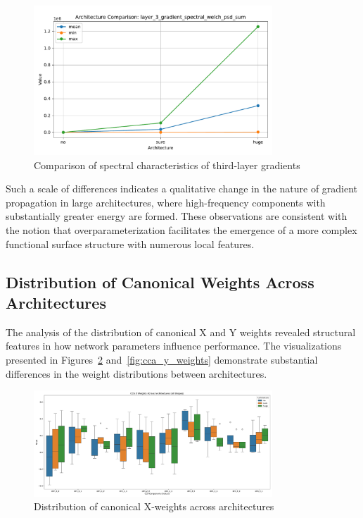 \documentclass[a4paper,12pt]{article}
\begin{document}
\begin{figure}[ht]
  \centering
  \includegraphics[width=0.8\textwidth]{resources_en/layer_3_gradient_spectral_welch_psd_sum_comparison.pdf}
  \caption{Comparison of spectral characteristics of third-layer gradients}
  \label{fig:layer3_gradient_spectral}
\end{figure}

Such a scale of differences indicates a qualitative change in the nature of gradient propagation in large
architectures, where high-frequency components with substantially greater energy are formed. These
observations are consistent with the notion that overparameterization facilitates the emergence of a more
complex functional surface structure with numerous local features.

\subsection{Distribution of Canonical Weights Across Architectures}

The analysis of the distribution of canonical X and Y weights revealed structural features in how network
parameters influence performance. The visualizations presented in Figures~\ref{fig:cca_x_weights}
and~\ref{fig:cca_y_weights} demonstrate substantial differences in the weight distributions between architectures.

\begin{figure}[ht]
  \centering
  \includegraphics[width=0.8\textwidth]{resources_en/cca_x_weights_all_shapes.pdf}
  \caption{Distribution of canonical X-weights across architectures}
  \label{fig:cca_x_weights}
\end{figure}
\end{document}
